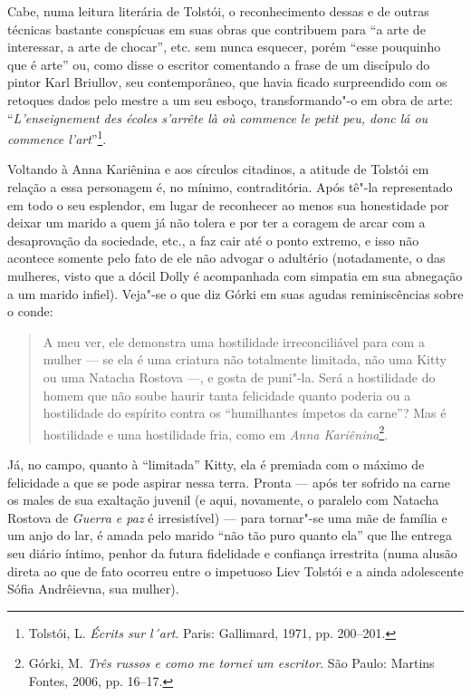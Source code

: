 {{Cabe, numa leitura literária de Tolstói, o reconhecimento dessas e de
outras técnicas bastante conspícuas em suas obras que contribuem para
``a arte de interessar, a arte de chocar'', etc. sem nunca esquecer,
porém ``esse pouquinho que é arte'' ou, como disse o escritor
comentando a frase de um discípulo do pintor Karl Briullov, seu
contemporâneo, que havia ficado surpreendido com os retoques dados pelo
mestre a um seu esboço, transformando"-o em obra de arte:
``\emph{L'enseignement des écoles s'arrête là où commence \emph{le petit
peu}, donc lá ou commence l'art}''\footnote{Tolstói, L. \emph{Écrits sur l´art}. Paris: Gallimard, 1971, pp.
200--201.}.

Voltando à Anna Kariênina e aos círculos citadinos, a atitude de
Tolstói em relação a essa personagem é, no mínimo, contraditória. Após
tê"-la representado em todo o seu esplendor, em lugar de reconhecer ao
menos sua honestidade por deixar um marido a quem já não tolera e
por ter a coragem de arcar com a desaprovação da sociedade, etc., a faz
cair até o ponto extremo, e isso não acontece somente pelo fato de ele
não advogar o adultério (notadamente, o das mulheres, visto que a dócil
Dolly é acompanhada com simpatia em sua abnegação a um marido infiel).
Veja"-se o que diz Górki em suas agudas reminiscências sobre o conde:

\begin{quote}
A meu ver, ele demonstra uma hostilidade irreconciliável para com a
mulher --- se ela é uma criatura não totalmente limitada, não uma Kitty
ou uma Natacha Rostova ---, e gosta de puni"-la. Será a hostilidade do
homem que não soube haurir tanta felicidade quanto poderia ou a
hostilidade do espírito contra os ``humilhantes ímpetos da carne''? Mas é
hostilidade e uma hostilidade fria, como em \emph{Anna Kariênina}\footnote{Górki, M. \emph{Três russos e como me tornei um escritor}. São Paulo: Martins Fontes, 2006, pp. 16--17.}.
\end{quote}

Já, no campo, quanto à ``limitada'' Kitty, ela é premiada com o
máximo de felicidade a que se pode aspirar nessa terra. Pronta ---
após ter sofrido na carne os males de sua exaltação juvenil (e aqui,
novamente, o paralelo com Natacha Rostova de \emph{Guerra e paz} é
irresistível) --- para tornar"-se uma mãe de família e um anjo do lar, é
amada pelo marido ``não tão puro quanto ela'' que lhe entrega seu diário
íntimo, penhor da futura fidelidade e confiança irrestrita (numa alusão
direta ao que de fato ocorreu entre o impetuoso Liev Tolstói e a ainda
adolescente Sófia Andrêievna, sua mulher).

}}
